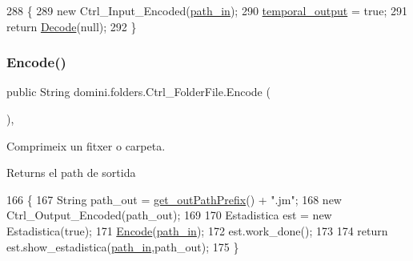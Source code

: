 \begin{DoxyCode}
288                                \{
289         \textcolor{keyword}{new} Ctrl\_Input\_Encoded(\hyperlink{classdomini_1_1folders_1_1Ctrl__FolderFile_a0d3946bb2832a1f34d0c2227df5c71c4}{path\_in});
290         \hyperlink{classdomini_1_1folders_1_1Ctrl__FolderFile_a0db81590abe27b21a9b8c37633c86fa6}{temporal\_output} = \textcolor{keyword}{true};
291         \textcolor{keywordflow}{return} \hyperlink{classdomini_1_1folders_1_1Ctrl__FolderFile_a5d28ac7f5223ecd40a242148e86447c1}{Decode}(null);
292     \}
\end{DoxyCode}
\mbox{\label{classdomini_1_1folders_1_1Ctrl__FolderFile_a7c47fd5127ae6f713a4fa7f75002a6f6}} 
\subsubsection{\texorpdfstring{Encode()}{Encode()}\hspace{0.1cm}{\footnotesize\ttfamily [1/2]}}
{\footnotesize\ttfamily public String domini.\+folders.\+Ctrl\+\_\+\+Folder\+File.\+Encode (\begin{DoxyParamCaption}{ }\end{DoxyParamCaption})\hspace{0.3cm}{\ttfamily [inline]}, {\ttfamily [private]}}



Comprimeix un fitxer o carpeta. 

\begin{DoxyReturn}{Returns}
el path de sortida 
\end{DoxyReturn}

\begin{DoxyCode}
166                             \{
167         String path\_out = \hyperlink{classdomini_1_1folders_1_1Ctrl__FolderFile_a11c6b1b4a25d12b8091c7c96b3da1ea7}{get\_outPathPrefix}() + \textcolor{stringliteral}{".jm"};
168         \textcolor{keyword}{new} Ctrl\_Output\_Encoded(path\_out);
169 
170         Estadistica est = \textcolor{keyword}{new} Estadistica(\textcolor{keyword}{true});
171         \hyperlink{classdomini_1_1folders_1_1Ctrl__FolderFile_a7c47fd5127ae6f713a4fa7f75002a6f6}{Encode}(\hyperlink{classdomini_1_1folders_1_1Ctrl__FolderFile_a0d3946bb2832a1f34d0c2227df5c71c4}{path\_in});
172         est.work\_done();
173 
174         \textcolor{keywordflow}{return} est.show\_estadistica(\hyperlink{classdomini_1_1folders_1_1Ctrl__FolderFile_a0d3946bb2832a1f34d0c2227df5c71c4}{path\_in},path\_out);
175     \}
\end{DoxyCode}
\mbox{\label{classdomini_1_1folders_1_1Ctrl__FolderFile_ac2cb74a86677ce947b403cc63b91e874}} 
